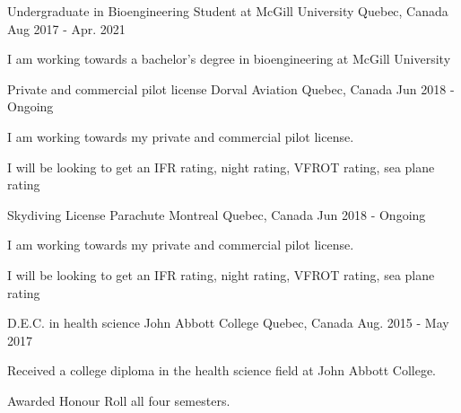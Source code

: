 
\begin{cventries}
\cventry
    {Undergraduate in Bioengineering}
    {Student at McGill University}
    {Quebec, Canada}
    {Aug 2017 - Apr. 2021}
    {
      \begin{cvitems}
        \item {I am working towards a bachelor's degree in bioengineering at McGill University}
      \end{cvitems}
    }    \newline

    \cventry
    {Private and commercial pilot license}
    {Dorval Aviation}
    {Quebec, Canada}
    {Jun 2018 - Ongoing}
    {
      \begin{cvitems}
        \item {I am working towards my private and commercial pilot license.}
        \item {I will be looking to get an IFR rating, night rating, VFROT rating, sea plane rating}
      \end{cvitems}
    }    \newline
    
    \cventry
    {Skydiving License}
    {Parachute Montreal}
    {Quebec, Canada}
    {Jun 2018 - Ongoing}
    {
      \begin{cvitems}
        \item {I am working towards my private and commercial pilot license.}
        \item {I will be looking to get an IFR rating, night rating, VFROT rating, sea plane rating}
      \end{cvitems}
    }    \newline
    
  \cventry
    {D.E.C. in health science}
    {John Abbott College}
    {Quebec, Canada}
    {Aug. 2015 - May 2017}
    {
      \begin{cvitems}
        \item {Received a college diploma in the health science field at John Abbott College.}
        \item {Awarded Honour Roll all four semesters.}
      \end{cvitems}
    }
\end{cventries}
